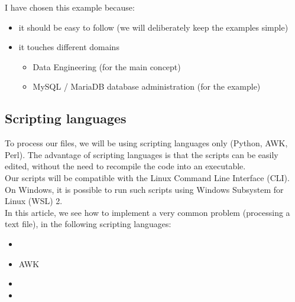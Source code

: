I have chosen this example because:
\begin{itemize}
	\item it should be easy to follow (we will deliberately keep the examples simple)
	\item it touches different domains
	\begin{itemize}
		\item Data Engineering (for the main concept)
		\item MySQL / MariaDB database administration (for the example)
	\end{itemize}
\end{itemize}


\medskip

\subsection*{Scripting languages}

To process our files, we will be using scripting languages only (Python, AWK, Perl).
The advantage of scripting languages is that the scripts can be easily edited, without the need to recompile the code into an executable. \\

Our scripts will be compatible with the Linux Command Line Interface (CLI). 
On Windows, it is possible to run such scripts using Windows Subsystem for Linux (WSL) 2. \\




In this article, we see how to implement a very common problem (processing a text file), in the following scripting languages: 

\begin{itemize}
	\item \python
	\item AWK
	\item \perl
	\item \julia
\end{itemize}

\newpage

